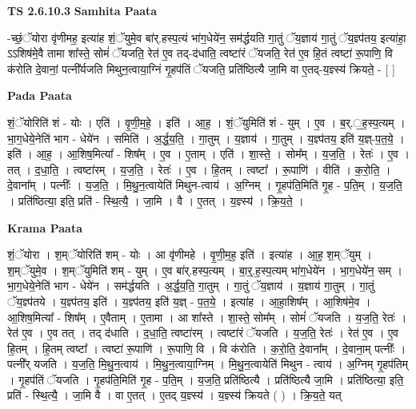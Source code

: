 \documentclass[17pt]{extarticle}
\begin{document}
\textbf{TS 2.6.10.3 } \newline
\textbf{Samhita Paata} \newline

-च्छं॒ॅयोरा वृ॑णीमह॒ इत्या॑ह शं॒ॅयुमे॒व बा॑र्.हस्प॒त्यं भा॑ग॒धेये॑न॒ सम॑र्द्धयति गा॒तुं ॅय॒ज्ञाय॑ गा॒तुं ॅय॒ज्ञ्प॑तय॒ इत्या॑हा॒ ऽऽशिष॑मे॒वै तामा शा᳚स्ते॒ सोमं॑ ॅयजति॒ रेत॑ ए॒व तद्-द॑धाति॒ त्वष्टा॑रं ॅयजति॒ रेत॑ ए॒व हि॒तं त्वष्टा॑ रू॒पाणि॒ वि क॑रोति दे॒वानां॒ पत्नी᳚र्यजति मिथुन॒त्वाया॒ग्निं गृ॒हप॑तिं ॅयजति॒ प्रति॑ष्ठित्यै जा॒मि वा ए॒तद्-य॒ज्ञ्स्य॑ क्रियते॒ - [  ] \newline

\textbf{Pada Paata} \newline

शं॒ॅयोरिति॑ शं - योः । एति॑ । वृ॒णी॒म॒हे॒ । इति॑ । आ॒ह॒ । शं॒ॅयुमिति॑ शं - युम् । ए॒व । ब॒र्.॒ह॒स्प॒त्यम् । भा॒ग॒धेये॒नेति॑ भाग - धेये॑न । समिति॑ । अ॒र्द्ध॒य॒ति॒ । गा॒तुम् । य॒ज्ञाय॑ । गा॒तुम् । य॒ज्ञ्प॑तय॒ इति॑ य॒ज्ञ्-प॒त॒ये॒ । इति॑ । आ॒ह॒ । आ॒शिष॒मित्या᳚ - शिष᳚म् । ए॒व । ए॒ताम् । एति॑ । शा॒स्ते॒ । सोम᳚म् । य॒ज॒ति॒ । रेतः॑ । ए॒व । तत् । द॒धा॒ति॒ । त्वष्टा॑रम् । य॒ज॒ति॒ । रेतः॑ । ए॒व । हि॒तम् । त्वष्टा᳚ । रू॒पाणि॑ । वीति॑ । क॒रो॒ति॒ । दे॒वाना᳚म् । पत्नीः᳚ । य॒ज॒ति॒ । मि॒थु॒न॒त्वायेति॑ मिथुन-त्वाय॑ । अ॒ग्निम् । गृ॒हप॑ति॒मिति॑ गृ॒ह - प॒ति॒म् । य॒ज॒ति॒ । प्रति॑ष्ठित्या॒ इति॒ प्रति॑ - स्थि॒त्यै॒ । जा॒मि । वै । ए॒तत् । य॒ज्ञ्स्य॑ । क्रि॒य॒ते॒ ।  \newline


\textbf{Krama Paata} \newline

शं॒ॅयोरा । श॒म्ॅयोरिति॑ शम् - योः । आ वृ॑णीमहे । वृ॒णी॒म॒ह॒ इति॑ । इत्या॑ह । आ॒ह॒ श॒म्ॅयुम् । श॒म्ॅयुमे॒व । श॒म्ॅयुमिति॑ शम् - युम् । ए॒व बा॑र्.हस्प॒त्यम् । बा॒र्॒.ह॒स्प॒त्यम् भा॑ग॒धेये॑न । भा॒ग॒धेये॑न॒ सम् । भा॒ग॒धेये॒नेति॑ भाग - धेये॑न । सम॑र्द्धयति । अ॒र्द्ध॒य॒ति॒ गा॒तुम् । गा॒तुं ॅय॒ज्ञाय॑ । य॒ज्ञाय॑ गा॒तुम् । गा॒तुं ॅय॒ज्ञ्प॑तये । य॒ज्ञ्प॑तय॒ इति॑ । य॒ज्ञ्प॑तय॒ इति॑ य॒ज्ञ् - प॒त॒ये॒ । इत्या॑ह । आ॒हा॒शिष᳚म् । आ॒शिष॑मे॒व । आ॒शिष॒मित्या᳚ - शिष᳚म् । ए॒वैताम् । ए॒तामा । आ शा᳚स्ते । शा॒स्ते॒ सोम᳚म् । सोमं॑ ॅयजति । य॒ज॒ति॒ रेतः॑ । रेत॑ ए॒व । ए॒व तत् । तद् द॑धाति । द॒धा॒ति॒ त्वष्टा॑रम् । त्वष्टा॑रं ॅयजति । य॒ज॒ति॒ रेतः॑ । रेत॑ ए॒व । ए॒व हि॒तम् । हि॒तम् त्वष्टा᳚ । त्वष्टा॑ रू॒पाणि॑ । रू॒पाणि॒ वि । वि क॑रोति । क॒रो॒ति॒ दे॒वाना᳚म् । दे॒वाना॒म् पत्नीः᳚ । पत्नी᳚र् यजति । य॒ज॒ति॒ मि॒थु॒न॒त्वाय॑ । मि॒थु॒न॒त्वाया॒ग्निम् । मि॒थु॒न॒त्वायेति॑ मिथुन - त्वाय॑ । अ॒ग्निम् गृ॒हप॑तिम् । गृ॒हप॑तिं ॅयजति । गृ॒हप॑ति॒मिति॑ गृ॒ह - प॒ति॒म् । य॒ज॒ति॒ प्रति॑ष्ठित्यै । प्रति॑ष्ठित्यै जा॒मि । प्रति॑ष्ठित्या॒ इति॒ प्रति॑ - स्थि॒त्यै॒ । जा॒मि वै । वा ए॒तत् । ए॒तद् य॒ज्ञ्स्य॑ । य॒ज्ञ्स्य॑ क्रियते ( ) । क्रि॒य॒ते॒ यत् \newline
\end{document}

